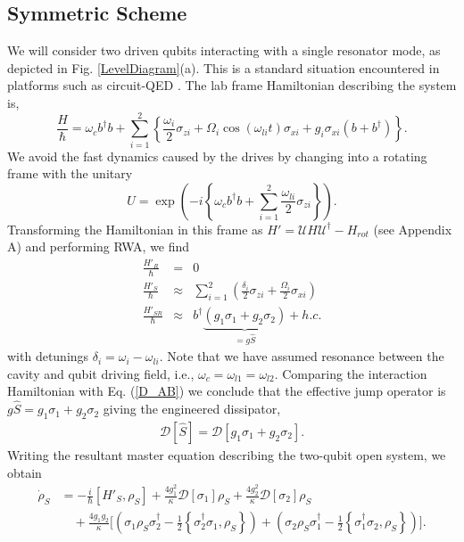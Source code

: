 \subsection{Symmetric Scheme}
We will consider two driven qubits interacting with a single resonator mode, as depicted in Fig. \ref{LevelDiagram}(a). This is a standard situation encountered in platforms such as circuit-QED \cite{Wallraff2004}. The lab frame Hamiltonian describing the system is,
\begin{equation}\label{Two Quipt Pamametric Couplings}
\frac{H}{\hbar} = \omega_c b^\dagger b + \sum_{i=1}^2 \left\{ \frac{\omega_i}{2}\sigma_{zi} + \Omega_i \cos \left( \omega_{li} t \right) \sigma_{xi} + g_i \sigma_{xi} \left( b + b^\dagger \right)\right\}.
\end{equation}
We avoid the fast dynamics caused by the drives by changing into a rotating frame with the  unitary
%
\begin{equation}\label{Equ:Rotating_Hamiltonian}
U = \exp\left(-i\left\{\omega_c b^\dagger b + \sum_{i=1}^{2} \frac{\omega_{li}}{2}\sigma_{zi}\right\}\right).
\end{equation}
%
Transforming the Hamiltonian in this frame as $H' = \mathcal{U} H \mathcal{U}^\dagger - H_{rot}$ (see Appendix A) and performing RWA, we find
%
\begin{eqnarray}\label{Two_Qubit_Hamiltonian}
\frac{H'_R}{\hbar} & = & 0 \nonumber \\
\frac{H'_S}{\hbar} & \approx & \sum_{i=1}^2 \left( \frac{\delta_i}{2}  \sigma_{zi}  + \frac{\Omega_i}{2} \sigma_{xi} \right) \nonumber \\
\frac{H'_{SR}}{\hbar} & \approx &  b^\dagger \underbrace{( g_1 \sigma_1 + g_2 \sigma_2 )}_\text{$=g\hat{S}$} + h.c. 
\end{eqnarray} 
%
with detunings $ \delta_i = \omega_i -\omega_{li}$. Note that we have assumed resonance between the cavity and qubit driving field, i.e., $\omega_c = \omega_{l1} = \omega_{l2}$. Comparing the interaction Hamiltonian with Eq. (\ref{D_AB}) we conclude that the effective jump operator is $g\hat{S} = g_1 \sigma_1 + g_2 \sigma_2$ giving the engineered dissipator,
%
\begin{eqnarray}
\mathcal{D}[\hat{S}] = \mathcal{D}[g_1 \sigma_1 + g_2 \sigma_2].
\end{eqnarray}
%
Writing the resultant master equation describing the two-qubit open system, we obtain
%
\begin{align}\label{Expand reduced system ME}
\dot{\rho}_S  & = - \frac{i}{\hbar} [H'_S, \rho_S] + \frac{4 g_1^2}{\kappa}\mathcal{D}[\sigma_1]\rho_S +  \frac{4 g_2^2}{\kappa}\mathcal{D}[\sigma_2]\rho_S \nonumber \\
& \quad + \frac{4  g_1 g_2 }{\kappa} \bigg[  \left(\sigma_1 \rho_S \sigma_2^\dagger - \frac{1}{2} \left \lbrace \sigma_2^\dagger \sigma_1 , \rho_S \right\rbrace \right) + \left( \sigma_2 \rho_S \sigma_1^\dagger - \frac{1}{2} \left \lbrace \sigma_1^\dagger \sigma_2 , \rho_S \right\rbrace \right) \biggr].
\end{align}
